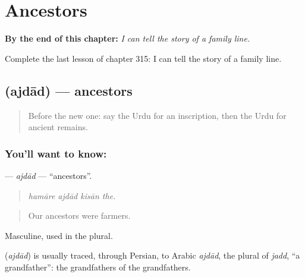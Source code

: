 
\chapter{Ancestors}
\label{ch:ur-ancestors}

\begin{chapteropening}
\textbf{By the end of this chapter:} \emph{I can tell the story of a family line.}

Complete the last lesson of chapter 315: I can tell the story of a family line.
\end{chapteropening}

\section[\texorpdfstring{\ur{اجداد} (ajdād)}{اجداد (ajdād)}]{ (ajdād) — ancestors}

\label{lesson:UR-C315-ajdad}



\begin{quote}
Before the new one: say the Urdu for an inscription, then the Urdu for ancient remains.
\end{quote}

\subsection*{You'll want to know: }
\textbf{} — \emph{ajdād} — \textquotedblleft{}ancestors\textquotedblright{}.

\begin{quote}
   
\end{quote}

\begin{quote}
\emph{hamāre ajdād kisān the.}
\end{quote}

\begin{quote}
Our ancestors were farmers.
\end{quote}

Masculine, used in the plural.

\begin{cousinweb}
\textbf{} (\emph{ajdād}) is usually traced, through Persian, to Arabic \emph{ajdād}, the plural of \emph{jadd}, \textquotedblleft{}a grandfather\textquotedblright{}: the grandfathers of the grandfathers.
\end{cousinweb}

